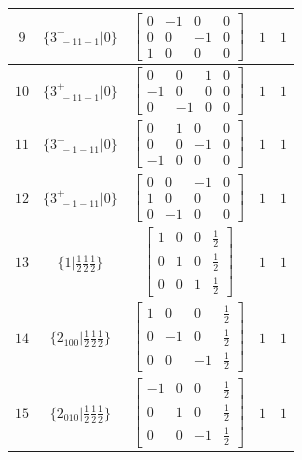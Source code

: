\documentclass[fleqn,8pt]{jsarticle}
\begin{document}
\begin{longtable}{ccccc}
$ 9 $ & $ \{3^{-}_{\,\,-11-1}|0\} $ & $ \begin{bmatrix} 0 & -1 & 0 & 0 \\ 0 & 0 & -1 & 0 \\ 1 & 0 & 0 & 0 \end{bmatrix} $ & $ 1 $ & $ 1 $ \\ \hline
$ 10 $ & $ \{3^{+}_{\,\,-11-1}|0\} $ & $ \begin{bmatrix} 0 & 0 & 1 & 0 \\ -1 & 0 & 0 & 0 \\ 0 & -1 & 0 & 0 \end{bmatrix} $ & $ 1 $ & $ 1 $ \\ \hline
$ 11 $ & $ \{3^{-}_{\,\,-1-11}|0\} $ & $ \begin{bmatrix} 0 & 1 & 0 & 0 \\ 0 & 0 & -1 & 0 \\ -1 & 0 & 0 & 0 \end{bmatrix} $ & $ 1 $ & $ 1 $ \\ \hline
$ 12 $ & $ \{3^{+}_{\,\,-1-11}|0\} $ & $ \begin{bmatrix} 0 & 0 & -1 & 0 \\ 1 & 0 & 0 & 0 \\ 0 & -1 & 0 & 0 \end{bmatrix} $ & $ 1 $ & $ 1 $ \\ \hline
$ 13 $ & $ \{1|\frac{1}{2} \frac{1}{2} \frac{1}{2}\} $ & $ \begin{bmatrix} 1 & 0 & 0 & \frac{1}{2} \\ 0 & 1 & 0 & \frac{1}{2} \\ 0 & 0 & 1 & \frac{1}{2} \end{bmatrix} $ & $ 1 $ & $ 1 $ \\ \hline
$ 14 $ & $ \{2{}_{100}|\frac{1}{2} \frac{1}{2} \frac{1}{2}\} $ & $ \begin{bmatrix} 1 & 0 & 0 & \frac{1}{2} \\ 0 & -1 & 0 & \frac{1}{2} \\ 0 & 0 & -1 & \frac{1}{2} \end{bmatrix} $ & $ 1 $ & $ 1 $ \\ \hline
$ 15 $ & $ \{2{}_{010}|\frac{1}{2} \frac{1}{2} \frac{1}{2}\} $ & $ \begin{bmatrix} -1 & 0 & 0 & \frac{1}{2} \\ 0 & 1 & 0 & \frac{1}{2} \\ 0 & 0 & -1 & \frac{1}{2} \end{bmatrix} $ & $ 1 $ & $ 1 $ \\ \hline

\end{longtable}
\end{document}
